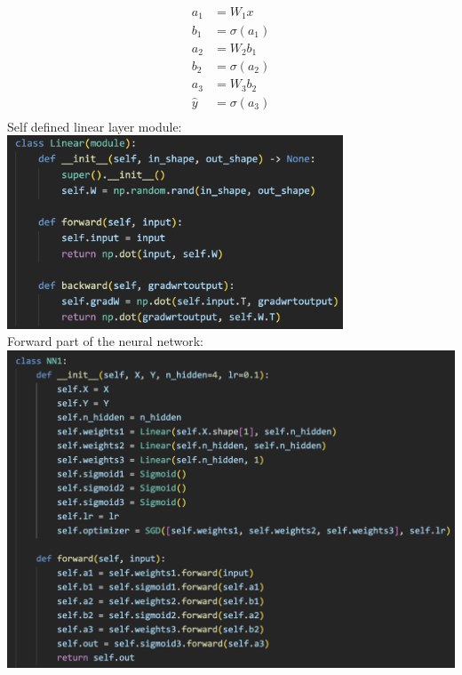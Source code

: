 \documentclass{article} %
\begin{document}
    \[
    \begin{aligned}
        a_1 &= W_1x \\
        b_1 &= \sigma(a_1) \\
        a_2 &= W_2b_1 \\
        b_2 &= \sigma(a_2) \\
        a_3 &= W_3b_2 \\
        \hat{y} &= \sigma(a_3) \\
    \end{aligned}
    \]Self defined linear layer module: \\
    \includegraphics[width=10cm]{./imgs/linear.png} \\
    Forward part of the neural network: \\
    \includegraphics[width=14cm]{./imgs/nn.png} \\
    
\end{document}
